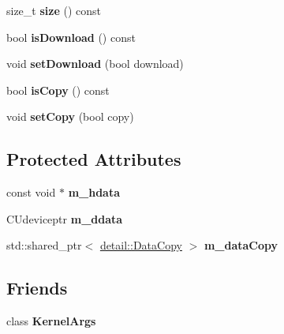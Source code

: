 \begin{DoxyCompactItemize}
\mbox{\label{classyacx_1_1_kernel_arg_a728724fe0e5bbbc6de98923dbb11d3b0}} 
size\+\_\+t {\bfseries size} () const
\item 
\mbox{\label{classyacx_1_1_kernel_arg_a2a1b003ed2124e1a446c6f4317b2217d}} 
bool {\bfseries is\+Download} () const
\item 
\mbox{\label{classyacx_1_1_kernel_arg_abdc0850586cdd62d3c4a86b1de190910}} 
void {\bfseries set\+Download} (bool download)
\item 
\mbox{\label{classyacx_1_1_kernel_arg_a10e211a6138fe61e256876e97e503a6b}} 
bool {\bfseries is\+Copy} () const
\item 
\mbox{\label{classyacx_1_1_kernel_arg_a46d69a02ec09adbbbcdb536a1ce2a2ba}} 
void {\bfseries set\+Copy} (bool copy)
\end{DoxyCompactItemize}
\subsection*{Protected Attributes}
\begin{DoxyCompactItemize}
\item 
\mbox{\label{classyacx_1_1_kernel_arg_aa5674ed7907ccae1b0af176fbbfa6454}} 
const void $\ast$ {\bfseries m\+\_\+hdata}
\item 
\mbox{\label{classyacx_1_1_kernel_arg_a21c0cabef64800bafe49f588d16beaa6}} 
C\+Udeviceptr {\bfseries m\+\_\+ddata}
\item 
\mbox{\label{classyacx_1_1_kernel_arg_a6e76bbe8fa15c20702fd7b1d052440fa}} 
std\+::shared\+\_\+ptr$<$ \hyperlink{classyacx_1_1detail_1_1_data_copy}{detail\+::\+Data\+Copy} $>$ {\bfseries m\+\_\+data\+Copy}
\end{DoxyCompactItemize}
\subsection*{Friends}
\begin{DoxyCompactItemize}
\item 
\mbox{\label{classyacx_1_1_kernel_arg_a487e05f65911a91df819064237f418b8}} 
class {\bfseries Kernel\+Args}
\end{DoxyCompactItemize}


